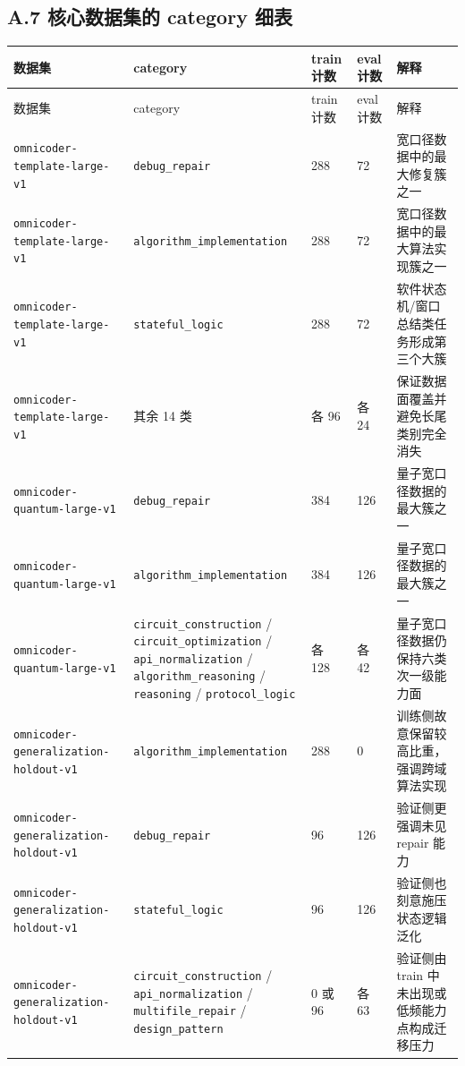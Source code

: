 \documentclass[11pt,a4paper]{article}
\newcommand{\code}[1]{\begingroup\ttfamily\footnotesize\nolinkurl{#1}\endgroup}
\begin{document}
\subsection{A.7 核心数据集的 category 细表}

\small
\begin{longtable}{T{2.9cm} T{3.3cm} p{1.3cm} p{1.3cm} p{4.9cm}}
\toprule
数据集 & category & train 计数 & eval 计数 & 解释 \\
\midrule
\endfirsthead
\toprule
数据集 & category & train 计数 & eval 计数 & 解释 \\
\midrule
\endhead
\code{omnicoder-template-large-v1} & \code{debug\_repair} & 288 & 72 & 宽口径数据中的最大修复簇之一 \\
\code{omnicoder-template-large-v1} & \code{algorithm\_implementation} & 288 & 72 & 宽口径数据中的最大算法实现簇之一 \\
\code{omnicoder-template-large-v1} & \code{stateful\_logic} & 288 & 72 & 软件状态机/窗口总结类任务形成第三个大簇 \\
\code{omnicoder-template-large-v1} & 其余 14 类 & 各 96 & 各 24 & 保证数据面覆盖并避免长尾类别完全消失 \\
\code{omnicoder-quantum-large-v1} & \code{debug\_repair} & 384 & 126 & 量子宽口径数据的最大簇之一 \\
\code{omnicoder-quantum-large-v1} & \code{algorithm\_implementation} & 384 & 126 & 量子宽口径数据的最大簇之一 \\
\code{omnicoder-quantum-large-v1} & \parbox[t]{\linewidth}{\code{circuit\_construction} / \code{circuit\_optimization} /\\ \code{api\_normalization} / \code{algorithm\_reasoning} /\\ \code{reasoning} / \code{protocol\_logic}} & 各 128 & 各 42 & 量子宽口径数据仍保持六类次一级能力面 \\
\code{omnicoder-generalization-holdout-v1} & \code{algorithm\_implementation} & 288 & 0 & 训练侧故意保留较高比重，强调跨域算法实现 \\
\code{omnicoder-generalization-holdout-v1} & \code{debug\_repair} & 96 & 126 & 验证侧更强调未见 repair 能力 \\
\code{omnicoder-generalization-holdout-v1} & \code{stateful\_logic} & 96 & 126 & 验证侧也刻意施压状态逻辑泛化 \\
\code{omnicoder-generalization-holdout-v1} & \parbox[t]{\linewidth}{\code{circuit\_construction} / \code{api\_normalization} /\\ \code{multifile\_repair} / \code{design\_pattern}} & 0 或 96 & 各 63 & 验证侧由 train 中未出现或低频能力点构成迁移压力 \\

\end{longtable}
\end{document}
